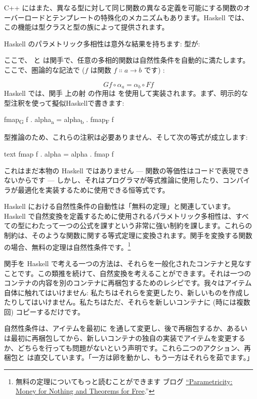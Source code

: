 C++ にはまた、異なる型に対して同じ関数の異なる定義を可能にする関数のオーバーロードとテンプレートの特殊化のメカニズムもあります。Haskell では、この機能は型クラスと型の族によって提供されます。

Haskell のパラメトリック多相性は意外な結果を持ちます: 型が: 

ここで、 と  は関手で、任意の多相的関数は自然性条件を自動的に満たします。ここで、圏論的な記法で ($f$ は関数 $f \Colon a \to b$ です) : 

\[G f \circ \alpha_a = \alpha_b \circ F f\]
Haskell では、関手  上の射  の作用は  を使用して実装されます。まず、明示的な型注釈を使って擬似Haskellで書きます: 

\begin{snipv}
fmap\textsubscript{G} f . alpha\textsubscript{a} = alpha\textsubscript{b} . fmap\textsubscript{F} f
\end{snipv}
型推論のため、これらの注釈は必要ありません、そして次の等式が成立します: 

\begin{snip}{text}
fmap f . alpha = alpha . fmap f
\end{snip}
これはまだ本物の Haskell ではありません --- 関数の等価性はコードで表現できないからです --- しかし、それはプログラマが等式推論に使用したり、コンパイラが最適化を実装するために使用できる恒等式です。

Haskell における自然性条件の自動性は「無料の定理」と関連しています。Haskell で自然変換を定義するために使用されるパラメトリック多相性は、すべての型にわたって一つの公式を課すという非常に強い制約を課します。これらの制約は、そのような関数に関する等式定理に変換されます。関手を変換する関数の場合、無料の定理は自然性条件です。\footnote{
  無料の定理についてもっと読むことができます
  ブログ \href{https://bartoszmilewski.com/2014/09/22/parametricity-money-for-nothing-and-theorems-for-free/}{``Parametricity:
    Money for Nothing and Theorems for Free}.''}

関手を Haskell で考える一つの方法は、それらを一般化されたコンテナと見なすことです。この類推を続けて、自然変換を考えることができます。それは一つのコンテナの内容を別のコンテナに再梱包するためのレシピです。我々はアイテム自体に触れてはいけません: 私たちはそれらを変更したり、新しいものを作成したりしてはいけません。私たちはただ、それらを新しいコンテナに (時には複数回) コピーするだけです。

自然性条件は、アイテムを最初に  を通して変更し、後で再梱包するか、あるいは最初に再梱包してから、新しいコンテナの独自の実装でアイテムを変更するか、どちらを行っても問題がないという声明です。これら二つのアクション、再梱包と  は直交しています。「一方は卵を動かし、もう一方はそれらを茹でます。」

